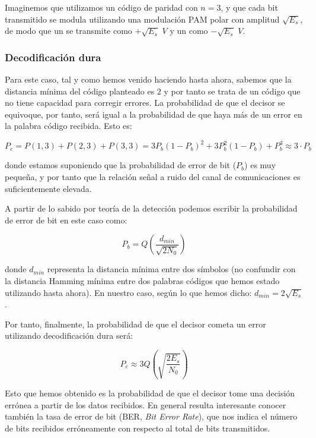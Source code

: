 \documentclass[es,apuntes]{uah}
\begin{document}
Imaginemos que utilizamos un código de paridad con $n=3$, y que cada bit transmitido se modula utilizando una modulación PAM polar con amplitud $\sqrt{E_s}$, de modo que un  se transmite como $+\sqrt{E_s}\,\,V$ y un  como $-\sqrt{E_s}\,\,V$.

\subsubsection{Decodificación dura}

Para este caso, tal y como hemos venido haciendo hasta ahora, sabemos que la distancia mínima del código planteado es $2$ y por tanto se trata de un código que no tiene capacidad para corregir errores. La probabilidad de que el decisor se equivoque, por tanto, será igual a la probabilidad de que haya más de un error en la palabra código recibida. Esto es:

\begin{displaymath}
	P_e = P(1,3) + P(2,3) + P(3,3) = 3 P_b (1-P_b)^2 + 3 P_b^2 (1-P_b) + P_b^3 \approx 3 \cdot P_b
\end{displaymath}

donde estamos suponiendo que la probabilidad de error de bit ($P_b$) es muy pequeña, y por tanto que la relación señal a ruido del canal de comunicaciones es suficientemente elevada. 

A partir de lo sabido por teoría de la detección podemos escribir la probabilidad de error de bit en este caso como:

\begin{displaymath}
	P_b = Q \left ( \frac{d_{min}}{\sqrt{2 N_0}} \right )
\end{displaymath}

donde $d_{min}$ representa la distancia mínima entre dos símbolos (no confundir con la distancia Hamming mínima entre dos palabras códigos que hemos estado utilizando hasta ahora). En nuestro caso, según lo que hemos dicho: $d_{min} = 2\sqrt{E_s}$. 

Por tanto, finalmente, la probabilidad de que el decisor cometa un error utilizando decodificación dura será:

\begin{displaymath}
	P_e \approx 3 Q \left ( \sqrt{\frac{2 E_s}{N_0}} \right )
\end{displaymath}

Esto que hemos obtenido es la probabilidad de que el decisor tome una decisión errónea a partir de los datos recibidos. En general resulta interesante conocer también la tasa de error de bit (BER, \emph{Bit Error Rate}), que nos indica el número de bits recibidos erróneamente con respecto al total de bits transmitidos.
\end{document}
